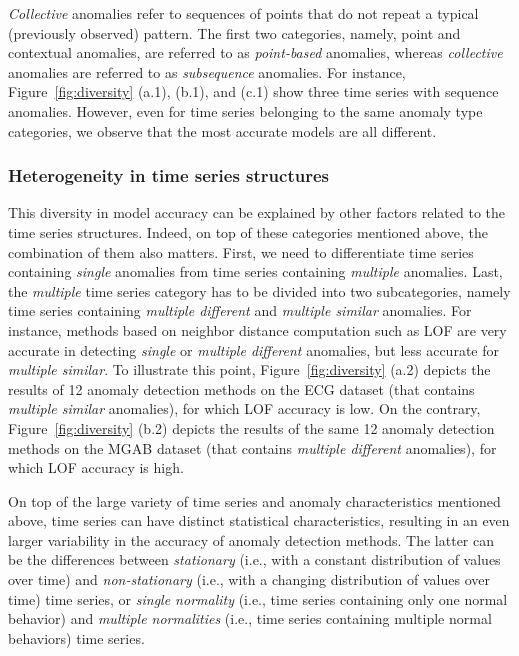 \textit{Collective} anomalies refer to sequences of points that do not repeat a typical (previously observed) pattern. The first two categories, namely, point and contextual anomalies, are referred to as \textit{point-based} anomalies, whereas \textit{collective} anomalies are referred to as \textit{subsequence} anomalies. For instance, Figure~\ref{fig:diversity} (a.1), (b.1), and (c.1) show three time series with sequence anomalies. However, even for time series belonging to the same anomaly type categories, we observe that the most accurate models are all different.  

\vspace{-0.1cm}
\subsubsection{\textbf{Heterogeneity in time series structures}}

This diversity in model accuracy can be explained by other factors related to the time series structures. Indeed, on top of these categories mentioned above, the combination of them also matters. First, we need to differentiate time series containing \textit{single} anomalies from time series containing \textit{multiple} anomalies. Last, the \textit{multiple} time series category has to be divided into two subcategories, namely time series containing \textit{multiple different} and \textit{multiple similar} anomalies. For instance, methods based on neighbor distance computation such as LOF are very accurate in detecting \textit{single} or \textit{multiple different} anomalies, but less accurate for \textit{multiple similar}. To illustrate this point, Figure~\ref{fig:diversity} (a.2) depicts the results of 12 anomaly detection methods on the ECG dataset (that contains \syl{}%
\textit{multiple similar} anomalies), for which LOF accuracy is low. On the contrary, Figure~\ref{fig:diversity} (b.2) depicts the results of the same 12 anomaly detection methods on the MGAB dataset (that contains \syl{}%
\textit{multiple different} anomalies), for which LOF accuracy is high.

On top of the large variety of time series and anomaly characteristics mentioned above, time series can have distinct statistical characteristics, resulting in an even larger variability in the accuracy of anomaly detection methods. %
The latter can be the differences between \textit{stationary} (i.e., with a constant distribution of values over time) and \textit{non-stationary} (i.e., with a changing distribution of values over time) time series, or \textit{single normality} (i.e., time series containing only one normal behavior) and \textit{multiple normalities} (i.e., time series containing multiple normal behaviors) time series. 

